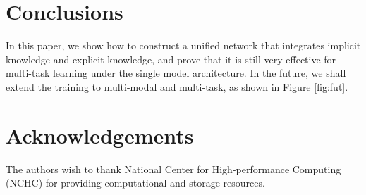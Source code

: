 \documentclass[10pt,twocolumn,letterpaper]{article}
\begin{document}
\section{Conclusions}

In this paper, we show how to construct a unified network that integrates implicit knowledge and explicit knowledge, and prove that it is still very effective for multi-task learning under the single model architecture. In the future, we shall extend the training to multi-modal and multi-task, as shown in Figure \ref{fig:fut}.

\section{Acknowledgements}

The authors wish to thank National Center for High-performance Computing (NCHC) for
providing computational and storage resources.



\clearpage
\clearpage
\clearpage
\end{document}

